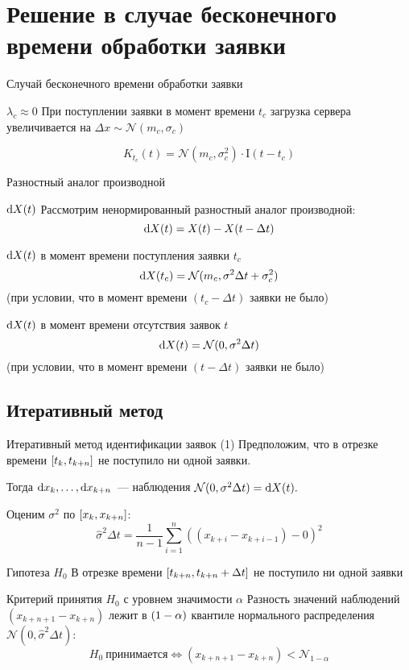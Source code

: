\documentclass[utf8]{beamer}
\begin{document}
\section[$\lambda_c \approx 0$]{Решение в случае бесконечного времени обработки заявки}
\begin{frame}{Случай бесконечного времени обработки заявки}
\begin{block}{$\lambda_c \approx 0$}
  При поступлении заявки в момент времени $t_c$ загрузка сервера увеличивается на 
  $\Delta x \sim \mathcal{N}(m_c, \sigma_c)$

  $$K_{t_c}(t) = \mathcal{N}(m_c, \sigma_c^2) \cdot \mathrm{I}(t - t_c)$$
\end{block}
\end{frame}


\begin{frame}{Разностный аналог производной}
\begin{block}{$\dif X(t)$}
  Рассмотрим ненормированный разностный аналог производной:
  $$\dif X(t) = X(t) - X(t - \Delta t)$$
\end{block}
\begin{block}{$\dif X(t)$ в момент времени поступления заявки $t_c$}
  $$\dif X(t_c) = \mathcal{N}(m_c, \sigma^2 \Delta t + \sigma_c^2)$$
  (при условии, что в момент времени $(t_c - \Delta t)$ заявки не было)
\end{block}
\begin{block}{$\dif X(t)$ в момент времени отсутствия заявок $t$}
  $$\dif X(t) = \mathcal{N}(0, \sigma^2 \Delta t)$$
  (при условии, что в момент времени $(t - \Delta t)$ заявки не было)
\end{block}
\end{frame}


\subsection{Итеративный метод}
\begin{frame}{Итеративный метод идентификации заявок (1)}
Предположим, что в отрезке времени $\sbr{t_k, t_{k+n}}$ 
не поступило ни одной заявки.

Тогда $\dif x_k, \dots, \dif x_{k+n}$~--- наблюдения 
$\mathcal{N}(0, \sigma^2 \Delta t) = \dif X(t).$

Оценим $\sigma^2$ по $\sbr{x_k, x_{k+n}}$:
$$\widehat{\sigma}^2 \Delta t = 
    \frac{1}{n-1}
        \sum\limits_{i=1}^n ((x_{k+i} - x_{k+i-1}) - 0)^2$$

\begin{block}{Гипотеза $H_0$}
  В отрезке времени $\sbr{t_{k+n}, t_{k+n} + \Delta t}$ не поступило ни 
  одной заявки
\end{block}
\begin{block}{Критерий принятия $H_0$ с уровнем значимости $\alpha$}
Разность значений наблюдений $(x_{k+n+1}-x_{k+n})$
лежит в $\del{1 - \alpha}$ квантиле
нормального распределения $\mathcal{N}(0, \widehat{\sigma}^2 \Delta t)$:
$$
H_0 \  \mathrm{\text{принимается}} \iff
        (x_{k+n+1}-x_{k+n}) < 
	    \mathcal{N}_{1 - \alpha}
$$
\end{block}
\end{frame}
\end{document}
